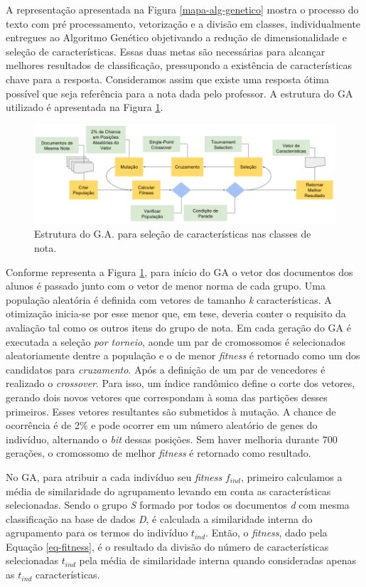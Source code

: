 A representação apresentada na Figura \ref{mapa-alg-genetico} mostra o processo do texto com pré processamento, vetorização e a divisão em classes, individualmente entregues ao Algoritmo Genético objetivando a redução de dimensionalidade e seleção de características. Essas duas metas são necessárias para alcançar melhores resultados de classificação, pressupondo a existência de características chave para a resposta. Consideramos assim que existe uma resposta ótima possível que seja referência para a nota dada pelo professor. A estrutura do GA utilizado é apresentada na Figura \ref{calibracao-GA}.

\begin{figure}[th]
\centering
\includegraphics[width=.9\textwidth]{./img/estrutura-ga.png}
\caption{Estrutura do G.A. para seleção de características nas classes de nota.}
\label{calibracao-GA}
\end{figure}

Conforme representa a Figura \ref{calibracao-GA}, para início do GA o vetor dos documentos dos alunos é passado junto com o vetor de menor norma de cada grupo. Uma população aleatória é definida com vetores de tamanho \textit{k} características. A otimização inicia-se por esse menor que, em tese, deveria conter o requisito da avaliação tal como os outros itens do grupo de nota. Em cada geração do GA é executada a seleção \textit{por torneio}, aonde um par de cromossomos é selecionados aleatoriamente dentre a população e o de menor \textit{fitness} é retornado como um dos candidatos para \textit{cruzamento}. Após a definição de um par de vencedores é realizado o \textit{crossover}. Para isso, um índice randômico define o corte dos vetores, gerando dois novos vetores que correspondam à soma das partições desses primeiros. Esses vetores resultantes são submetidos à mutação. A chance de ocorrência é de 2\% e pode ocorrer em um número aleatório de genes do indivíduo, alternando o \textit{bit} dessas posições. Sem haver melhoria durante 700 gerações, o cromossomo de melhor \textit{fitness} é retornado como resultado.

No GA, para atribuir a cada indivíduo seu \textit{fitness} $f_{ind}$, primeiro calculamos a média de similaridade do agrupamento levando em conta as características selecionadas. Sendo o grupo \textit{S} formado por todos os documentos \textit{d} com mesma classificação na base de dados \textit{D}, é calculada a similaridade interna do agrupamento para os termos do indivíduo $ t_{ind} $. Então, o \textit{fitness}, dado pela Equação \ref{eq-fitness}, é o resultado da divisão do número de características selecionadas $ t_{ind} $ pela média de similaridade interna quando consideradas apenas as $ t_{ind} $ características.

